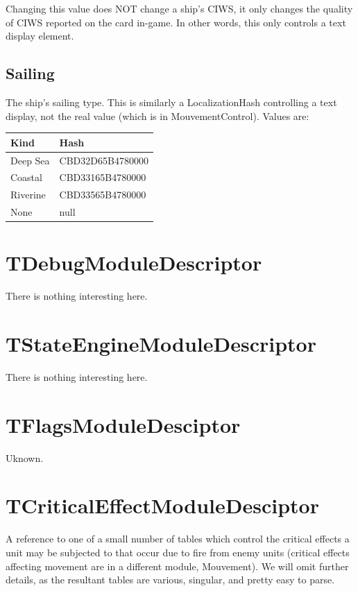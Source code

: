 \documentclass{article}
\begin{document}
Changing this value does NOT change a ship's CIWS, it only changes the quality of CIWS reported on the card in-game. In other words, this only controls a text display element.

\subsection{Sailing}

The ship's sailing type. This is similarly a LocalizationHash controlling a text display, not the real value (which is in MouvementControl). Values are:

\begin{center}
    \begin{tabular}{ | l | l |}
    \hline
	Kind & Hash\\ \hline
	Deep Sea & CBD32D65B4780000\\
	Coastal & CBD33165B4780000\\
	Riverine & CBD33565B4780000\\
	None & null\\
    \hline
    \end{tabular}
\end{center}

\section{TDebugModuleDescriptor}

There is nothing interesting here.

\section{TStateEngineModuleDescriptor}

There is nothing interesting here.

\section{TFlagsModuleDesciptor}

Uknown.

\section{TCriticalEffectModuleDesciptor}

A reference to one of a small number of tables which control the critical effects a unit may be subjected to that occur due to fire from enemy units (critical effects affecting movement are in a different module, Mouvement). We will omit further details, as the resultant tables are various, singular, and pretty easy to parse.
\end{document}
